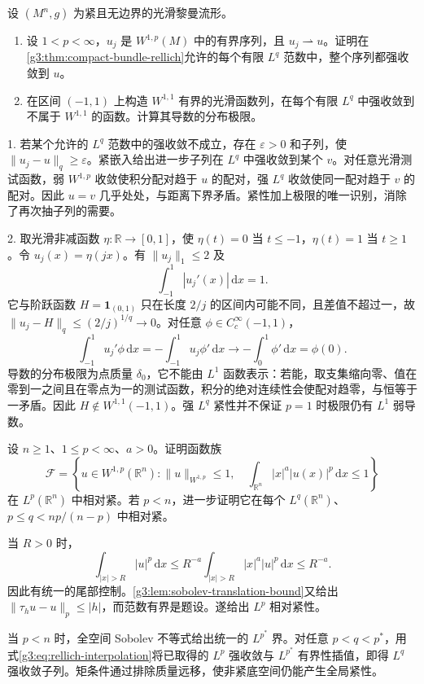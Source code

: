 \begin{exercise}\label{g3:ex:weak-and-strong-sobolev-limits}
	设 \((M^n,g)\) 为紧且无边界的光滑黎曼流形。
	\begin{enumerate}
		\item 设 \(1<p<\infty\)，\(u_j\) 是 \(W^{1,p}(M)\) 中的有界序列，且 \(u_j\rightharpoonup u\)。证明在\cref{g3:thm:compact-bundle-rellich}允许的每个有限 \(L^q\) 范数中，整个序列都强收敛到 \(u\)。
		\item 在区间 \((-1,1)\) 上构造 \(W^{1,1}\) 有界的光滑函数列，在每个有限 \(L^q\) 中强收敛到不属于 \(W^{1,1}\) 的函数。计算其导数的分布极限。
	\end{enumerate}
\end{exercise}
\begin{solution}
	1. 若某个允许的 \(L^q\) 范数中的强收敛不成立，存在 \(\varepsilon>0\) 和子列，使 \(\|u_j-u\|_q\ge\varepsilon\)。紧嵌入给出进一步子列在 \(L^q\) 中强收敛到某个 \(v\)。对任意光滑测试函数，弱 \(W^{1,p}\) 收敛使积分配对趋于 \(u\) 的配对，强 \(L^q\) 收敛使同一配对趋于 \(v\) 的配对。因此 \(u=v\) 几乎处处，与距离下界矛盾。紧性加上极限的唯一识别，消除了再次抽子列的需要。

	2. 取光滑非减函数 \(\eta:\mathbb R\to[0,1]\)，使 \(\eta(t)=0\) 当 \(t\le-1\)，\(\eta(t)=1\) 当 \(t\ge1\)。令 \(u_j(x)=\eta(jx)\)。有 \(\|u_j\|_1\le2\) 及
	\[
		\int_{-1}^1|u_j'(x)|\,\mathrm dx=1.
	\]
	它与阶跃函数 \(H=\mathbf1_{(0,1)}\) 只在长度 \(2/j\) 的区间内可能不同，且差值不超过一，故 \(\|u_j-H\|_q\le(2/j)^{1/q}\to0\)。对任意 \(\phi\in C_c^\infty(-1,1)\)，
	\[
		\int_{-1}^1u_j'\phi\,\mathrm dx=-\int_{-1}^1u_j\phi'\,\mathrm dx
		\longrightarrow-\int_0^1\phi'\,\mathrm dx=\phi(0).
	\]
	导数的分布极限为点质量 \(\delta_0\)，它不能由 \(L^1\) 函数表示：若能，取支集缩向零、值在零到一之间且在零点为一的测试函数，积分的绝对连续性会使配对趋零，与恒等于一矛盾。因此 \(H\notin W^{1,1}(-1,1)\)。强 \(L^q\) 紧性并不保证 \(p=1\) 时极限仍有 \(L^1\) 弱导数。
\end{solution}

\begin{exercise}\label{g3:ex:sobolev-tightness-moment}
	设 \(n\ge1\)、\(1\le p<\infty\)、\(a>0\)。证明函数族
	\[
		\mathcal F=\left\{u\in W^{1,p}(\mathbb R^n):
		\|u\|_{W^{1,p}}\le1,\quad
		\int_{\mathbb R^n}|x|^a|u(x)|^p\,\mathrm dx\le1\right\}
	\]
	在 \(L^p(\mathbb R^n)\) 中相对紧。若 \(p<n\)，进一步证明它在每个 \(L^q(\mathbb R^n)\)、\(p\le q<np/(n-p)\) 中相对紧。
\end{exercise}
\begin{solution}
	当 \(R>0\) 时，
	\[
		\int_{|x|>R}|u|^p\,\mathrm dx\le R^{-a}\int_{|x|>R}|x|^a|u|^p\,\mathrm dx\le R^{-a}.
	\]
	因此有统一的尾部控制。\cref{g3:lem:sobolev-translation-bound}又给出 \(\|\tau_hu-u\|_p\le|h|\)，而范数有界是题设。遂给出 \(L^p\) 相对紧性。

	当 \(p<n\) 时，全空间 Sobolev 不等式给出统一的 \(L^{p^*}\) 界。对任意 \(p<q<p^*\)，用式\eqref{g3:eq:rellich-interpolation}将已取得的 \(L^p\) 强收敛与 \(L^{p^*}\) 有界性插值，即得 \(L^q\) 强收敛子列。矩条件通过排除质量远移，使非紧底空间仍能产生全局紧性。
\end{solution}

